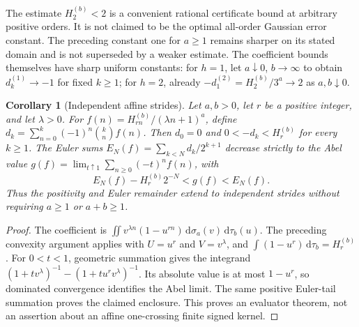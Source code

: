 \documentclass[11pt]{article}
\numberwithin{equation}{section}
\newtheorem{corollary}[theorem]{Corollary}
\theoremstyle{definition}
\theoremstyle{remark}
\newcommand{\dd}{\,\mathrm d}
\begin{document}
The estimate $H_2^{(b)}<2$ is a convenient rational certificate bound
at arbitrary positive orders. It is not claimed to be the optimal
all-order Gaussian error constant. The preceding constant one for
$a\ge1$ remains sharper on its stated domain and is not superseded by
a weaker estimate. The coefficient bounds themselves have sharp
uniform constants: for $h=1$, let $a\downarrow0$, $b\to\infty$ to
obtain $d_k^{(1)}\to-1$ for fixed $k\ge1$; for $h=2$, already
$-d_1^{(2)}=H_2^{(b)}/3^a\to2$ as $a,b\downarrow0$.

\begin{corollary}[Independent affine strides]\label{cor:affine}
Let $a,b>0$, let $r$ be a positive integer, and let $\lambda>0$.
For $f(n)=H_{rn}^{(b)}/(\lambda n+1)^a$, define
$d_k=\sum_{n=0}^k(-1)^n\binom kn f(n)$. Then $d_0=0$ and
$0<-d_k<H_r^{(b)}$ for every $k\ge1$. The Euler sums
$E_N(f)=\sum_{k<N}d_k/2^{k+1}$ decrease strictly to the Abel value
$g(f)=\lim_{t\uparrow1}\sum_{n\ge0}(-t)^nf(n)$, with
\[
 E_N(f)-H_r^{(b)}2^{-N}<g(f)<E_N(f).
\]
Thus the positivity and Euler remainder extend to independent strides
without requiring $a\ge1$ or $a+b\ge1$.
\end{corollary}
\begin{proof}
The coefficient is
$\iint v^{\lambda n}(1-u^{rn})\dd\sigma_a(v)\dd\tau_b(u)$.
The preceding convexity argument applies with $U=u^r$ and
$V=v^\lambda$, and $\int(1-u^r)\dd\tau_b=H_r^{(b)}$.
For $0<t<1$, geometric summation gives the integrand
$(1+tv^\lambda)^{-1}-(1+tu^rv^\lambda)^{-1}$.
Its absolute value is at most $1-u^r$, so dominated convergence
identifies the Abel limit. The same positive Euler-tail summation
proves the claimed enclosure. This proves an evaluator theorem, not
an assertion about an affine one-crossing finite signed kernel.
\end{proof}
\end{document}
